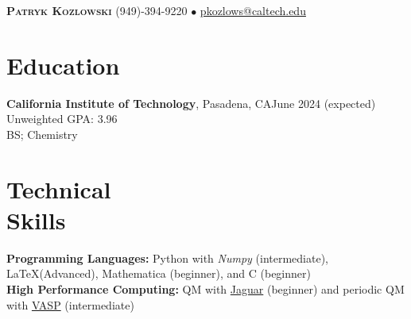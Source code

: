 \documentclass[margin,line]{resume}
\begin{document}
{\Large \textbf{\scshape Patryk Kozlowski}
\normalsize
\hspace{70mm}(949)-394-9220 $\bullet$ \url{pkozlows@caltech.edu}
}
\begin{resume}

\section{\mysidestyle Education}
\textbf{California Institute of Technology}, Pasadena, CA\hfill June 2024 (expected)\\
Unweighted GPA: 3.96\\
BS; Chemistry

\section{\mysidestyle Technical\\ Skills}
\textbf{Programming Languages:} Python with \emph{Numpy} (intermediate), \LaTeX  (Advanced), Mathematica (beginner), and C (beginner)\\
\textbf{High Performance Computing:} QM with \href{https://www.schrodinger.com/products/jaguar}{Jaguar} (beginner) and periodic QM with \href{https://www.vasp.at/}{VASP} (intermediate)


\end{resume}
\end{document}
